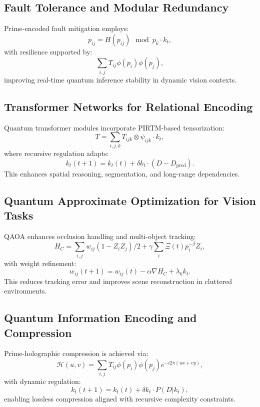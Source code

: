 \documentclass{article}
\theoremstyle{plain}
\begin{document}
\subsection{Fault Tolerance and Modular Redundancy}
Prime-encoded fault mitigation employs:
\begin{equation}
p_{ij} = H(p_{ij}) \mod p_k \cdot k_t,
\end{equation}
with resilience supported by:
\begin{equation}
\sum_{i,j} T_{ij} \phi(p_i) \phi(p_j),
\end{equation}
improving real-time quantum inference stability in dynamic vision contexts.

\subsection{Transformer Networks for Relational Encoding}
Quantum transformer modules incorporate PIRTM-based tensorization:
\begin{equation}
T = \sum_{i,j,k} T_{ijk} \otimes \psi_{ijk} \cdot k_t,
\end{equation}
where recursive regulation adapts:
\begin{equation}
k_t(t+1) = k_t(t) + \delta k_t \cdot (D - D_\text{pred}).
\end{equation}
This enhances spatial reasoning, segmentation, and long-range dependencies.

\subsection{Quantum Approximate Optimization for Vision Tasks}
QAOA enhances occlusion handling and multi-object tracking:
\begin{equation}
H_C = \sum_{i,j} w_{ij} (1 - Z_i Z_j) / 2 + \gamma \sum_i \Xi(t) p_i^{-\beta} Z_i,
\end{equation}
with weight refinement:
\begin{equation}
w_{ij}(t+1) = w_{ij}(t) - \alpha \nabla H_C + \lambda_k k_t.
\end{equation}
This reduces tracking error and improves scene reconstruction in cluttered environments.

\subsection{Quantum Information Encoding and Compression}
Prime-holographic compression is achieved via:
\begin{equation}
\mathcal{H}(u, v) = \sum_{i,j} T_{ij} \phi(p_i) \phi(p_j) e^{-i 2\pi (ux + vy)},
\end{equation}
with dynamic regulation:
\begin{equation}
k_t(t+1) = k_t(t) + \delta k_t \cdot P(D | k_t),
\end{equation}
enabling lossless compression aligned with recursive complexity constraints.
\end{document}
